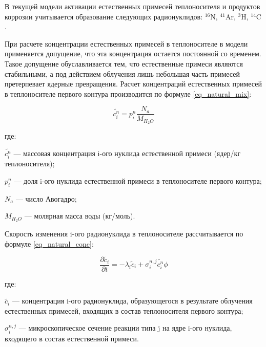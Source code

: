 В текущей модели активации естественных примесей теплоносителя и продуктов коррозии учитывается образование следующих 
радионуклидов: $^{16}\text{N}$, $^{41}\text{Ar}$, $^{3}\text{H}$, $^{14}\text{C}$.

При расчете концентрации естественных примесей в теплоносителе в модели применяется допущение, что эта концентрация 
остается постоянной со временем. Такое допущение обуславливается тем, что естественные примеси являются стабильными, а 
под действием облучения лишь небольшая часть примесей претерпевает ядерные превращения. Расчет концентраций естественных 
примесей в теплоносителе первого контура производится по формуле \ref{eq_natural_mix}:

\begin{equation}
    \label{eq_natural_mix}
    \widetilde{c_{i}^{n}} = p_{i}^{n} \frac{N_{a}}{M_{H_{2}O}}
\end{equation}

где:
\begin{description}
    \item $\widetilde{c_{i}^{n}}$ --- массовая концентрация i-ого нуклида естественной примеси (ядер/кг теплоносителя);
    \item $p_{i}^{n}$ --- доля i-ого нуклида естественной примеси в теплоносителе первого контура;
    \item $N_{a}$ --- число Авогадро;
    \item $M_{H_{2}O}$ --- молярная масса воды (кг/моль).
\end{description}

Скорость изменения i-ого радионуклида в теплоносителе рассчитывается по формуле \ref{eq_natural_conc}:

\begin{equation}
    \label{eq_natural_conc}
    \frac{\partial \widetilde{c}_{i}}{\partial t} = -\lambda_{i}\widetilde{c}_{i} + \sigma_{i}^{n,j} \widetilde{c_{i}^{n}}
        \phi 
\end{equation}

где:
\begin{description}
    \item $\widetilde{c_{i}}$ --- концентрация i-ого радионуклида, образующегося в результате облучения естественных 
        примесей, входящих в состав теплоносителя первого контура;
    \item $\sigma_{i}^{n,j}$ --- микроскопическое сечение реакции типа j на ядре i-ого нуклида, входящего в состав 
        естественной примеси.
\end{description}

